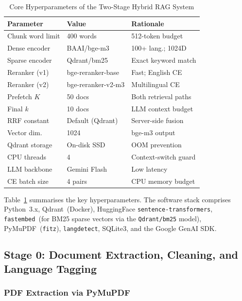\documentclass[conference]{IEEEtran}
\begin{document}
\begin{table}[t]
  \caption{Core Hyperparameters of the Two-Stage Hybrid RAG System}
  \label{tab:hyperparams}
  \centering
  \footnotesize
  \begin{tabular}{@{}p{2.2cm}p{2.4cm}p{2.4cm}@{}}
    \toprule
    \textbf{Parameter} & \textbf{Value} & \textbf{Rationale} \\
    \midrule
    Chunk word limit   & 400 words       & 512-token budget \\
    Dense encoder      & BAAI/bge-m3     & 100+ lang.; 1024D \\
    Sparse encoder     & Qdrant/bm25     & Exact keyword match \\
    Reranker (v1)      & bge-reranker-base & Fast; English CE \\
    Reranker (v2)      & bge-reranker-v2-m3 & Multilingual CE \\
    Prefetch $K$       & 50 docs         & Both retrieval paths \\
    Final $k$          & 10 docs         & LLM context budget \\
    RRF constant       & Default (Qdrant)& Server-side fusion \\
    Vector dim.        & 1024            & bge-m3 output \\
    Qdrant storage     & On-disk SSD     & OOM prevention \\
    CPU threads        & 4               & Context-switch guard \\
    LLM backbone       & Gemini Flash    & Low latency \\
    CE batch size      & 4 pairs         & CPU memory budget \\
    \bottomrule
  \end{tabular}
\end{table}

Table~\ref{tab:hyperparams} summarises the key hyperparameters.
The software stack comprises Python~3.x, Qdrant~(Docker), HuggingFace
\texttt{sentence-transformers}, \texttt{fastembed}~(for BM25 sparse vectors
via the \texttt{Qdrant/bm25} model), PyMuPDF~(\texttt{fitz}), \texttt{langdetect},
SQLite3, and the Google GenAI SDK.

\subsection{Stage 0: Document Extraction, Cleaning, and Language Tagging}
\label{sec:extraction}

\subsubsection{PDF Extraction via PyMuPDF}
\end{document}
